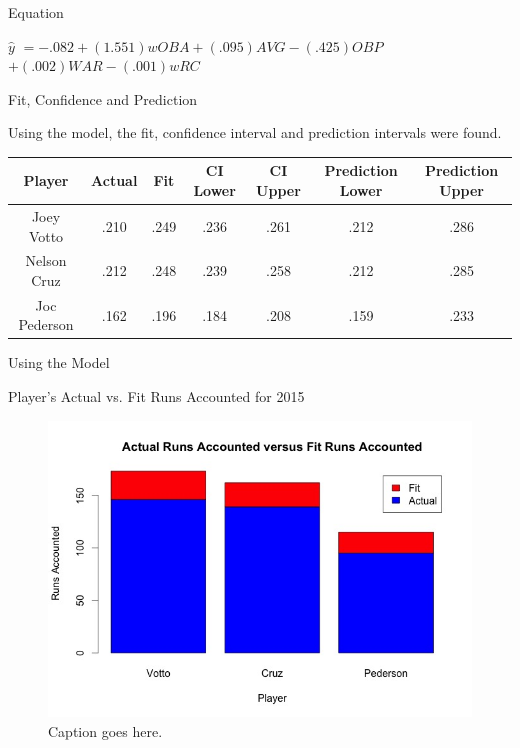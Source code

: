 \documentclass{beamer}
\begin{document}
\begin{frame}{Equation}

\begin{center}
$\hat{y}$ $= -.082 + (1.551)wOBA + (.095)AVG -(.425)OBP$\\
 $+ (.002)WAR - (.001)wRC$
\end{center}

\end{frame}


\begin{frame}{Fit, Confidence and Prediction}

Using the model, the fit, confidence interval and prediction intervals were found.

\begin{table}[]
\begin{tiny}
\centering
\begin{tabular}{|c|c|c|c|c|c|c|}
\hline
\textbf{Player} & \textbf{Actual} & \textbf{Fit} & \textbf{CI Lower} & \textbf{CI Upper} & \textbf{Prediction Lower} & \textbf{Prediction Upper} \\ \hline
Joey Votto      & .210            & .249         & .236              & .261              & .212                      & .286                      \\ \hline
Nelson Cruz     & .212            & .248         & .239              & .258              & .212                      & .285                      \\ \hline
Joc Pederson    & .162            & .196         & .184              & .208              & .159                      & .233                      \\ \hline
\end{tabular}
\end{tiny}
\end{table}
\end{frame}

\begin{frame}{Using the Model}
\begin{block}{Player's Actual vs. Fit Runs Accounted for 2015}
\begin{figure}
\includegraphics[width=\textwidth]{FitRuns.jpeg}
\caption{\label{fig:your-figure}Caption goes here.}
\end{figure}
\end{block}
\end{frame}
\end{document}
